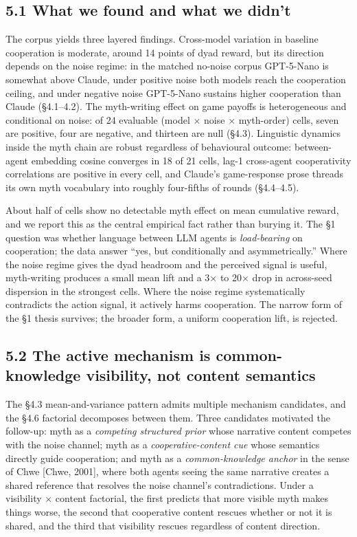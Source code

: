 \documentclass[
  10pt,
  letterpaper,
]{article}
\begin{document}
\subsection{5.1 What we found and what we
didn't}\label{what-we-found-and-what-we-didnt}

The corpus yields three layered findings. Cross-model variation in
baseline cooperation is moderate, around 14 points of dyad reward, but
its direction depends on the noise regime: in the matched no-noise
corpus GPT-5-Nano is somewhat above Claude, under positive noise both
models reach the cooperation ceiling, and under negative noise
GPT-5-Nano sustains higher cooperation than Claude (§4.1--4.2). The
myth-writing effect on game payoffs is heterogeneous and conditional on
noise: of 24 evaluable (model \(\times\) noise \(\times\) myth-order)
cells, seven are positive, four are negative, and thirteen are null
(§4.3). Linguistic dynamics inside the myth chain are robust regardless
of behavioural outcome: between-agent embedding cosine converges in 18
of 21 cells, lag-1 cross-agent cooperativity correlations are positive
in every cell, and Claude's game-response prose threads its own myth
vocabulary into roughly four-fifths of rounds (§4.4--4.5).

About half of cells show no detectable myth effect on mean cumulative
reward, and we report this as the central empirical fact rather than
burying it. The §1 question was whether language between LLM agents is
\emph{load-bearing} on cooperation; the data answer ``yes, but
conditionally and asymmetrically.'' Where the noise regime gives the
dyad headroom and the perceived signal is useful, myth-writing produces
a small mean lift and a 3\(\times\) to 20\(\times\) drop in across-seed
dispersion in the strongest cells. Where the noise regime systematically
contradicts the action signal, it actively harms cooperation. The narrow
form of the §1 thesis survives; the broader form, a uniform cooperation
lift, is rejected.

\subsection{5.2 The active mechanism is common-knowledge visibility, not
content
semantics}\label{the-active-mechanism-is-common-knowledge-visibility-not-content-semantics}

The §4.3 mean-and-variance pattern admits multiple mechanism candidates,
and the §4.6 factorial decomposes between them. Three candidates
motivated the follow-up: myth as a \emph{competing structured prior}
whose narrative content competes with the noise channel; myth as a
\emph{cooperative-content cue} whose semantics directly guide
cooperation; and myth as a \emph{common-knowledge anchor} in the sense
of Chwe {[}Chwe, 2001{]}, where both agents seeing the same narrative
creates a shared reference that resolves the noise channel's
contradictions. Under a visibility \(\times\) content factorial, the
first predicts that more visible myth makes things worse, the second
that cooperative content rescues whether or not it is shared, and the
third that visibility rescues regardless of content direction.
\end{document}
